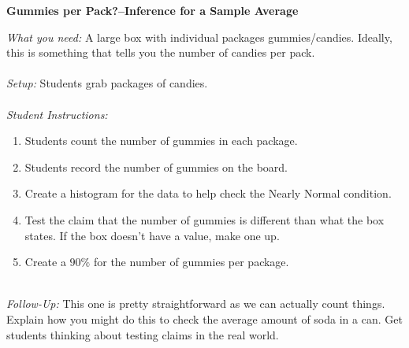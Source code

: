 \documentclass[12pt]{amsart}
\theoremstyle{definition}
\begin{document}
   \begin{framed}
   	\begin{center} \textbf{Gummies per Pack?--Inference for a Sample Average} \end{center}
   	\emph{What you need:} A large box with individual packages gummies/candies. Ideally, this is something that tells you the number of candies per pack.\\
   	~\\
   	\emph{Setup:} Students grab packages of candies.\\
   	~\\
   	\emph{Student Instructions:} 
   	\begin{enumerate}
   		\item Students count the number of gummies in each package.
   		\item Students record the number of gummies on the board.
   		\item Create a histogram for the data to help check the Nearly Normal condition.
   		\item Test the claim that the number of gummies is different than what the box states. If the box doesn't have a value, make one up.
   		\item Create a $90\%$ for the number of gummies per package.
   	\end{enumerate}
   	~\\
   	\emph{Follow-Up:} This one is pretty straightforward as we can actually count things. Explain how you might do this to check the average amount of soda in a can. Get students thinking about testing claims in the real world.
   \end{framed}
   
     \newpage
     
\end{document}
